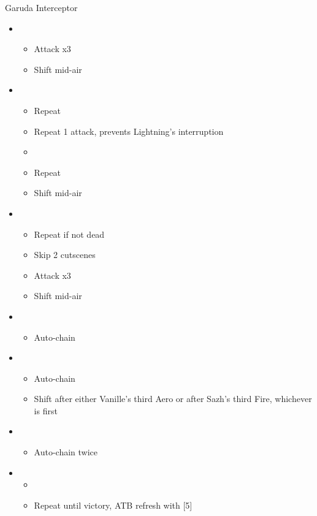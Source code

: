 \begin{battle}{Garuda Interceptor}
\begin{itemize}
    \item \first
    \begin{itemize}
        \item Attack x3
        \item Shift mid-air
    \end{itemize}
    \item \fifth
    \begin{itemize}
        \item Repeat
        \item Repeat 1 attack, prevents Lightning's interruption
        \item \stagger
        \item Repeat
        \item Shift mid-air
    \end{itemize}
    \item \first
    \begin{itemize}
        \item Repeat if not dead
        \item Skip 2 cutscenes
        \item Attack x3
        \item Shift mid-air
    \end{itemize}
    \item \third
    \begin{itemize}
        \item Auto-chain
    \end{itemize}
    \item \fourth
    \begin{itemize}
        \item Auto-chain
        \item Shift after either Vanille's third Aero or after Sazh's third Fire, whichever is first
    \end{itemize}
    \item \third
    \begin{itemize}
        \item Auto-chain twice
    \end{itemize}
    \item \first
    \begin{itemize}
        \item \stagger
        \item Repeat until victory, ATB refresh with [5]
    \end{itemize}
\end{itemize}
\end{battle}

